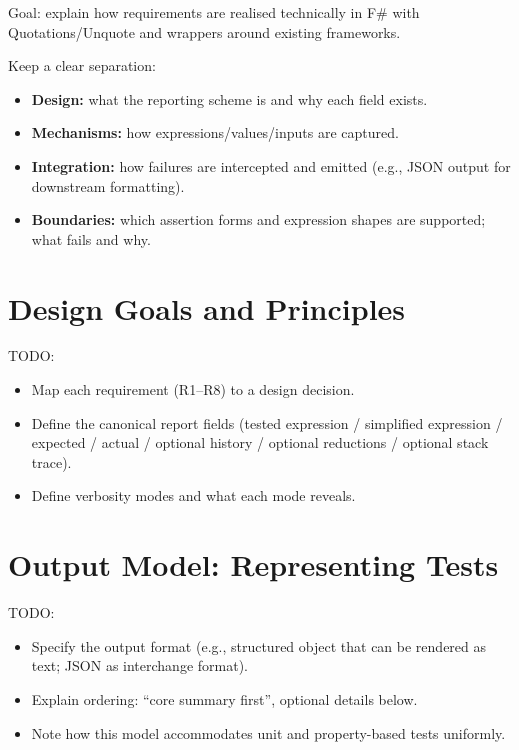 \documentclass[
	bibliography=totoc,
	listof=totoc,
]{scrbook}
\begin{document}
\begin{justify}
Goal: explain how requirements are realised technically in F\# with Quotations/Unquote and wrappers around existing frameworks.

Keep a clear separation:
\begin{itemize}
    \item \textbf{Design:} what the reporting scheme is and why each field exists.
    \item \textbf{Mechanisms:} how expressions/values/inputs are captured.
    \item \textbf{Integration:} how failures are intercepted and emitted (e.g., JSON output for downstream formatting).
    \item \textbf{Boundaries:} which assertion forms and expression shapes are supported; what fails and why.
\end{itemize}
\end{justify}


\section{Design Goals and Principles} %

\begin{marker}\begin{justify}
TODO:
\begin{itemize}
    \item Map each requirement (R1--R8) to a design decision.
    \item Define the canonical report fields (tested expression / simplified expression / expected / actual / optional history / optional reductions / optional stack trace).
    \item Define verbosity modes and what each mode reveals.
\end{itemize}
\end{justify}\end{marker}


\section{Output Model: Representing Tests} %

\begin{marker}\begin{justify}
TODO:
\begin{itemize}
    \item Specify the output format (e.g., structured object that can be rendered as text; JSON as interchange format).
    \item Explain ordering: ``core summary first'', optional details below.
    \item Note how this model accommodates unit and property-based tests uniformly.
\end{itemize}
\end{justify}\end{marker}
\end{document}
